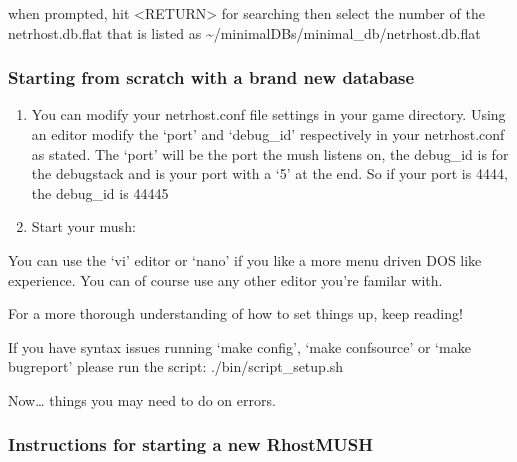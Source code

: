 \documentclass[letterpaper,10pt,english]{sphinxmanual}
\begin{document}
\sphinxAtStartPar
when prompted, hit \textless{}RETURN\textgreater{} for searching then select the number of the netrhost.db.flat that is listed as \textasciitilde{}/minimal\sphinxhyphen{}DBs/minimal\_db/netrhost.db.flat


\subsubsection{Starting from scratch with a brand new database}
\label{\detokenize{installation:starting-from-scratch-with-a-brand-new-database}}\begin{enumerate}
%
\item {} 
\sphinxAtStartPar
You can modify your netrhost.conf file settings in your game directory.
Using an editor modify the ‘port’ and ‘debug\_id’ respectively in your netrhost.conf as stated.
The ‘port’ will be the port the mush listens on, the debug\_id is for the debug\sphinxhyphen{}stack and is
your port with a ‘5’ at the end.  So if your port is 4444, the debug\_id is 44445

\item {} 
\sphinxAtStartPar
Start your mush:

\begin{sphinxVerbatim}[commandchars=\\\{\}]
 
\end{sphinxVerbatim}

\end{enumerate}

\sphinxAtStartPar
You can use the ‘vi’ editor or ‘nano’ if you like a more menu driven DOS like experience.
You can of course use any other editor you’re familar with.

\sphinxAtStartPar
For a more thorough understanding of how to set things up, keep reading!

\sphinxAtStartPar
If you have syntax issues running ‘make config’, ‘make confsource’
or ‘make bugreport’ please run the script: ./bin/script\_setup.sh

\sphinxAtStartPar
Now… things you may need to do on errors.


\subsubsection{Instructions for starting a new RhostMUSH}
\label{\detokenize{installation:instructions-for-starting-a-new-rhostmush}}
\end{document}

